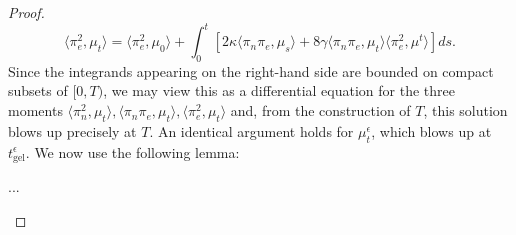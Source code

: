 \begin{proof}
\begin{equation}
    \langle \pi_e^2, \mu_t\rangle =
    \langle \pi_e^2, \mu_0\rangle + \int_0^t \left[2\kappa\langle \pi_n\pi_e, \mu_s\rangle+8\gamma\langle \pi_n\pi_e, \mu_t\rangle\langle\pi_e^2, \mu^t\rangle \right] ds.
\end{equation} Since the integrands appearing on the right-hand side are bounded on compact subsets of $[0,T)$, we may view this as a differential equation for the three moments $\langle \pi_n^2, \mu_t\rangle, \langle \pi_n \pi_e, \mu_t\rangle, \langle \pi_e^2, \mu_t\rangle$ and, from the construction of $T$, this solution blows up precisely at $T$. An identical argument holds for $\mu^\epsilon_t$, which blows up at $t^\epsilon_\text{gel}$. We now use the following lemma:
\begin{lemma} ...\end{lemma}




\iffalse We define the map \begin{equation}
    f(t) := \langle \pi_n^2, \mu_t\rangle
           + \sqrt{\frac{\langle \pi_n^2, \mu_0\rangle}
                        {\langle \pi_e^2, \mu_0\rangle}}
             \langle \pi_n \pi_e, \mu_t\rangle.
\end{equation} Then $f$ is finite on $[0, T)$, and so we find the differential equation on $[0,T)$ \begin{equation}
    \frac{d}{dt}f(t)=4\gamma\sqrt{\frac{\langle \pi_e^2, \mu_t\rangle}{\langle \pi_n^2, \mu_0\rangle}}f(t)^2
\end{equation} has a finite solution on $[0,T)$. By the previous calculation, $f$ blows up precisely at $t_\text{gel}$, and so $T\leq t_\text{gel}.$ On the other hand, we observe that there is some $C(\mu_0)$ such that, for all times $t<T$, \begin{equation}
    \langle (\pi_n+\pi_e)^2, \mu_t \rangle \leq Cf(t).
\end{equation} Therefore, if we assume that $T<t_\text{gel}$, we would conclude that $\sup_{t<T} \langle (\pi_n+\pi_e)^2, \mu_t\rangle <\infty$, which is a contradiction. Hence, $T=t_\text{gel}$, which proves the claimed result. \fi \end{proof} 
